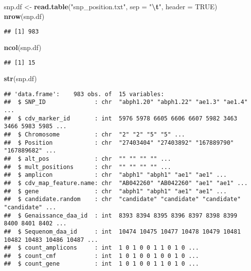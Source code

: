 \documentclass[
]{article}
\newenvironment{Shaded}{\begin{snugshade}}{\end{snugshade}}
\newcommand{\AttributeTok}[1]{\textcolor[rgb]{0.13,0.29,0.53}{#1}}
\newcommand{\ConstantTok}[1]{\textcolor[rgb]{0.56,0.35,0.01}{#1}}
\newcommand{\FunctionTok}[1]{\textcolor[rgb]{0.13,0.29,0.53}{\textbf{#1}}}
\newcommand{\NormalTok}[1]{#1}
\newcommand{\OtherTok}[1]{\textcolor[rgb]{0.56,0.35,0.01}{#1}}
\newcommand{\SpecialCharTok}[1]{\textcolor[rgb]{0.81,0.36,0.00}{\textbf{#1}}}
\newcommand{\StringTok}[1]{\textcolor[rgb]{0.31,0.60,0.02}{#1}}
\begin{document}
\begin{Shaded}
\begin{Highlighting}[]
\NormalTok{snp.df }\OtherTok{\textless{}{-}} \FunctionTok{read.table}\NormalTok{(}\StringTok{"snp\_position.txt"}\NormalTok{, }\AttributeTok{sep =} \StringTok{"}\SpecialCharTok{\textbackslash{}t}\StringTok{"}\NormalTok{, }\AttributeTok{header =} \ConstantTok{TRUE}\NormalTok{)}
\FunctionTok{nrow}\NormalTok{(snp.df)}
\end{Highlighting}
\end{Shaded}

\begin{verbatim}
## [1] 983
\end{verbatim}

\begin{Shaded}
\begin{Highlighting}[]
\FunctionTok{ncol}\NormalTok{(snp.df)}
\end{Highlighting}
\end{Shaded}

\begin{verbatim}
## [1] 15
\end{verbatim}

\begin{Shaded}
\begin{Highlighting}[]
\FunctionTok{str}\NormalTok{(snp.df)}
\end{Highlighting}
\end{Shaded}

\begin{verbatim}
## 'data.frame':    983 obs. of  15 variables:
##  $ SNP_ID              : chr  "abph1.20" "abph1.22" "ae1.3" "ae1.4" ...
##  $ cdv_marker_id       : int  5976 5978 6605 6606 6607 5982 3463 3466 5983 5985 ...
##  $ Chromosome          : chr  "2" "2" "5" "5" ...
##  $ Position            : chr  "27403404" "27403892" "167889790" "167889682" ...
##  $ alt_pos             : chr  "" "" "" "" ...
##  $ mult_positions      : chr  "" "" "" "" ...
##  $ amplicon            : chr  "abph1" "abph1" "ae1" "ae1" ...
##  $ cdv_map_feature.name: chr  "AB042260" "AB042260" "ae1" "ae1" ...
##  $ gene                : chr  "abph1" "abph1" "ae1" "ae1" ...
##  $ candidate.random    : chr  "candidate" "candidate" "candidate" "candidate" ...
##  $ Genaissance_daa_id  : int  8393 8394 8395 8396 8397 8398 8399 8400 8401 8402 ...
##  $ Sequenom_daa_id     : int  10474 10475 10477 10478 10479 10481 10482 10483 10486 10487 ...
##  $ count_amplicons     : int  1 0 1 0 0 1 1 0 1 0 ...
##  $ count_cmf           : int  1 0 1 0 0 1 0 0 1 0 ...
##  $ count_gene          : int  1 0 1 0 0 1 1 0 1 0 ...
\end{verbatim}
\end{document}
